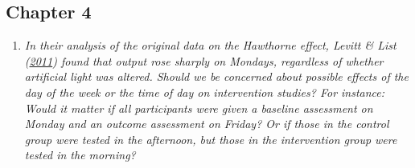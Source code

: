 \documentclass{krantz}
\begin{document}
\hypertarget{chapter-4}{%
\subsection{Chapter 4}\label{chapter-4}}

\begin{enumerate}
\def\labelenumi{\arabic{enumi}.}
\item
  \emph{In their analysis of the original data on the Hawthorne effect, Levitt \& List (\protect\hyperlink{ref-levitt2011}{2011}) found that output rose sharply on Mondays, regardless of whether artificial light was altered. Should we be concerned about possible effects of the day of the week or the time of day on intervention studies? For instance: Would it matter if all participants were given a baseline assessment on Monday and an outcome assessment on Friday? Or if those in the control group were tested in the afternoon, but those in the intervention group were tested in the morning?}


\end{enumerate}
\end{document}
